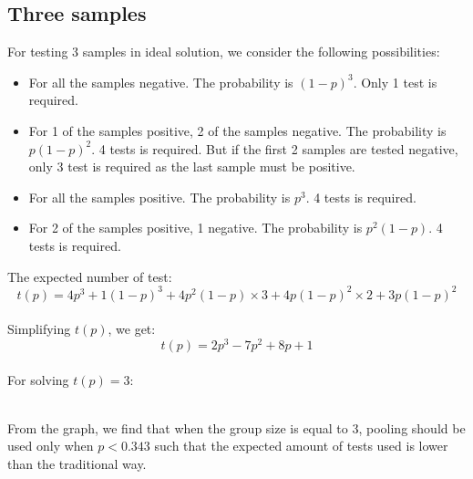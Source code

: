 \subsection{Three samples}
For testing 3 samples in ideal solution, we consider the following possibilities:

\begin{itemize}
  \item For all the samples negative. The probability is $(1-p)^3$. Only 1 test is required.
  \item For 1 of the samples positive, 2 of the samples negative. The probability is $p(1-p)^2$. 4 tests is required. But if the first 2 samples are tested negative, only 3 test is required as the last sample must be positive.
  \item For all the samples positive. The probability is $p^3$. 4 tests is required.
  \item For 2 of the samples positive, 1 negative. The probability is $p^2(1-p)$.  4 tests is required.
\end{itemize}
The expected number of test:
\\
\begin{displaymath}
t(p)=4p^{3}+1(1-p)^{3}+4p^{2}(1-p) \times 3+4p(1-p)^{2} \times 2+3p(1-p)^{2}
\end{displaymath}
\\
Simplifying $t(p)$, we get:
\\
\begin{displaymath}
t(p)=2p^{3}-7p^{2}+8p+1
\end{displaymath}
\\
For solving $t(p)=3$:

\begin{center}
\end{center}
\\
From the graph, we find that when the group size is equal to 3, pooling should be used only when $p<0.343$ such that the expected amount of tests used is lower than the traditional way.
